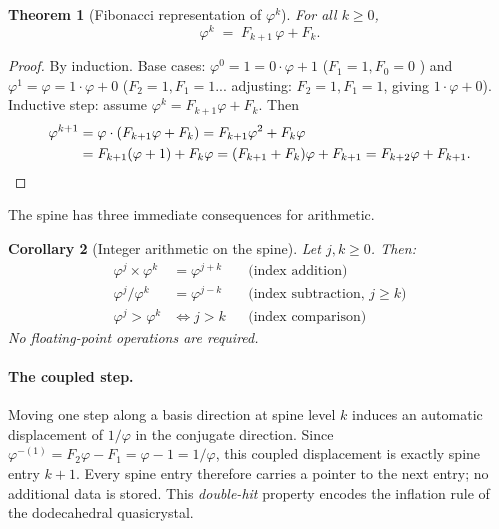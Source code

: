 \documentclass[12pt]{article}
\newtheorem{theorem}{Theorem}[section]
\newtheorem{corollary}[theorem]{Corollary}
\theoremstyle{definition}
\theoremstyle{remark}
\begin{document}
\begin{theorem}[Fibonacci representation of $\varphi^k$]
\label{thm:fibpow}
For all $k \geq 0$,
\[
  \varphi^k \;=\; F_{k+1}\,\varphi + F_k.
\]
\end{theorem}

\begin{proof}
By induction.  Base cases: $\varphi^0 = 1 = 0\cdot\varphi + 1$
($F_1=1, F_0=0$ \checkmark) and $\varphi^1 = \varphi = 1\cdot\varphi+0$
($F_2=1,F_1=1$... adjusting: $F_2=1,F_1=1$, giving $1\cdot\varphi+0$\checkmark).
Inductive step: assume $\varphi^k = F_{k+1}\varphi + F_k$.  Then
\begin{align*}
  \varphi^{k+1} &= \varphi\cdot(F_{k+1}\varphi + F_k)
               = F_{k+1}\varphi^2 + F_k\varphi \\
               &= F_{k+1}(\varphi+1) + F_k\varphi
               = (F_{k+1}+F_k)\varphi + F_{k+1}
               = F_{k+2}\varphi + F_{k+1}. \qedhere
\end{align*}
\end{proof}

The spine has three immediate consequences for arithmetic.

\begin{corollary}[Integer arithmetic on the spine]
\label{cor:spineops}
Let $j,k \geq 0$.  Then:
\begin{align}
  \varphi^j \times \varphi^k &= \varphi^{j+k}
    &&\text{(index addition)} \label{eq:mul}\\
  \varphi^j / \varphi^k &= \varphi^{j-k}
    &&\text{(index subtraction, } j\geq k\text{)} \label{eq:div}\\
  \varphi^j > \varphi^k &\iff j > k
    &&\text{(index comparison)} \label{eq:cmp}
\end{align}
No floating-point operations are required.
\end{corollary}

\paragraph{The coupled step.}
Moving one step along a basis direction at spine level $k$ induces an
automatic displacement of $1/\varphi$ in the conjugate direction.
Since $\varphi^{-(1)} = F_2\varphi - F_1 = \varphi - 1 = 1/\varphi$,
this coupled displacement is exactly spine entry $k+1$.  Every spine
entry therefore carries a pointer to the next entry; no additional data
is stored.  This \emph{double-hit} property encodes the inflation rule
of the dodecahedral quasicrystal.
\end{document}
